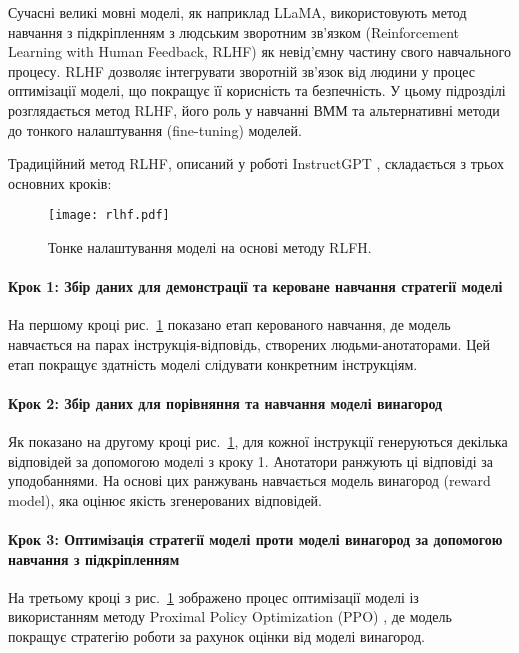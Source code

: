 Сучасні великі мовні моделі, як наприклад LLaMA, використовують метод навчання з підкріпленням з людським зворотним зв'язком (Reinforcement Learning with Human Feedback, RLHF) як невід'ємну частину свого навчального процесу. RLHF дозволяє інтегрувати зворотній зв'язок від людини у процес оптимізації моделі, що покращує її корисність та безпечність. У цьому підрозділі розглядається метод RLHF, його роль у навчанні ВММ та альтернативні методи до тонкого налаштування (fine-tuning) моделей.

Традиційний метод RLHF, описаний у роботі InstructGPT \cite{ouyang2022traininglanguagemodelsfollow}, складається з трьох основних кроків:

\begin{figure}[h]
    \centering
    \texttt{[image: rlhf.pdf]}
    \caption{Тонке налаштування моделі на основі методу RLFH.}
    \label{fig:rlhf}
\end{figure}

\paragraph{Крок 1: Збір даних для демонстрації та кероване навчання стратегії моделі}
На першому кроці рис.~\ref{fig:rlhf} показано етап керованого навчання, де модель навчається на парах інструкція-відповідь, створених людьми-анотаторами. Цей етап покращує здатність моделі слідувати конкретним інструкціям.

\paragraph{Крок 2: Збір даних для порівняння та навчання моделі винагород}
Як показано на другому кроці рис.~\ref{fig:rlhf}, для кожної інструкції генеруються декілька відповідей за допомогою моделі з кроку 1. Анотатори ранжують ці відповіді за уподобаннями. На основі цих ранжувань навчається модель винагород (reward model), яка оцінює якість згенерованих відповідей.

\paragraph{Крок 3: Оптимізація стратегії моделі проти моделі винагород за допомогою навчання з підкріпленням}
На третьому кроці з рис.~\ref{fig:rlhf} зображено процес оптимізації моделі із використанням методу Proximal Policy Optimization (PPO) \cite{schulman2017proximalpolicyoptimizationalgorithms}, де модель покращує стратегію роботи за рахунок оцінки від моделі винагород.

